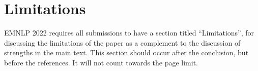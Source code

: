 \documentclass[11pt]{article}
\newcommand{\raq}[1]{\textcolor{blue}{[R: #1]}}
\newcommand{\note}[1]{\textcolor{red}{[#1]}}
\begin{document}
\begin{abstract}







\end{abstract}














\section*{Limitations}
EMNLP 2022 requires all submissions to have a section titled ``Limitations'', for discussing the limitations of the paper as a complement to the discussion of strengths in the main text. This section should occur after the conclusion, but before the references. It will not count towards the page limit.  
\end{document}
